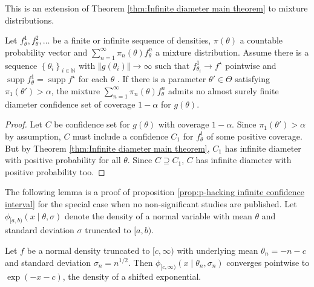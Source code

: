 \documentclass[twoside]{article}
\DeclareMathOperator{\supp}{supp}
\begin{document}
This is an extension of Theorem \ref{thm:Infinite diameter main theorem}
to mixture distributions.
\begin{prop}
\label{cor:Mixture model corollary}Let $f_{\theta}^{1},f_{\theta}^{2},\ldots$
be a finite or infinite sequence of densities, $\pi(\theta)$
a countable probability vector and $\sum_{n=1}^{\infty}\pi_{n}(\theta)f_{\theta}^{n}$
a mixture distribution. Assume there is a sequence $\left\{ \theta_{i}\right\} _{i\in\mathbb{N}}$
with $\left\Vert g(\theta_{i})\right\Vert \to\infty$ such
that $f_{\theta_{i}}^{1}\to f^{\star}$ pointwise and $\supp f_{\theta}^{1} = \supp f^{\star}$
for each $\theta$ . If there is a parameter $\theta'\in\Theta$ satisfying
$\pi_{1}(\theta')>\alpha$, the mixture $\sum_{n=1}^{\infty}\pi_{n}(\theta)f_{\theta}^{n}$
admits no almost surely finite diameter confidence set of coverage
$1-\alpha$ for $g(\theta)$.
\end{prop}

\begin{proof}
Let $C$ be confidence set for $g(\theta)$ with coverage
$1-\alpha$. Since $\pi_{1}(\theta')>\alpha$ by assumption,
$C$ must include a confidence $C_{1}$ for $f_{\theta}^{1}$ of some
positive coverage. But by Theorem \ref{thm:Infinite diameter main theorem},
$C_{1}$ has infinite diameter with positive probability for all $\theta$.
Since $C\supseteq C_{1}$, $C$ has infinite diameter with positive
probability too.
\end{proof}
The following lemma is a proof of proposition \ref{prop:p-hacking infinite confidence interval}
for the special case when no non-significant studies are published.
Let $\phi_{[a,b)}(x\mid\theta,\sigma)$ denote
the density of a normal variable with mean $\theta$ and standard
deviation $\sigma$ truncated to $[a,b)$.
\begin{lem}
\label{lem:One-sided normal limit}Let $f$ be a normal density truncated
to $[c,\infty)$ with underlying mean $\theta_{n}=-n-c$
and standard deviation $\sigma_{n}=n^{1/2}$. Then $\phi_{[c,\infty)}(x\mid\theta_{n},\sigma_{n})$
converges pointwise to $\exp(-x-c)$, the density of a
shifted exponential.
\end{lem}
\end{document}
